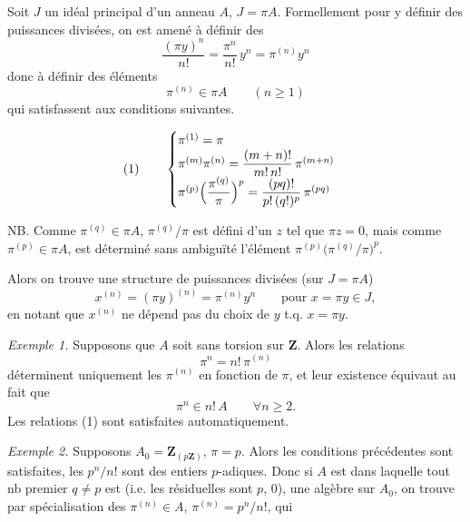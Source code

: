 \documentclass[11pt,a4paper]{article}
\begin{document}


Soit $J$ un idéal principal d'un anneau $A$, $J = \pi A$. Formellement pour
y définir des puissances divisées, on est amené à définir des
\[
\frac{(\pi y)^n}{n!} = \frac{\pi^n}{n!}\, y^n = \pi^{(n)} y^n
\]
donc à définir des éléments
\[
\pi^{(n)} \in \pi A \qquad (n \geq 1)
\]
qui satisfassent aux conditions suivantes.

 

\[
(1)\qquad
\begin{cases}
\pi^{(1)} = \pi \\ \pi^{(m)} \pi^{(n)} = \dfrac{(m+n)!}{m!\,n!}\, \pi^{(m+n)} \\ \pi^{(p)} \Bigl(\dfrac{\pi^{(q)}}{\pi}\Bigr)^{p} = \dfrac{(pq)!}{p!\,(q!)^p}\, \pi^{(pq)}
\end{cases}
\]

NB. Comme $\pi^{(q)} \in \pi A$, $\pi^{(q)}/\pi$ est défini  d'un $z$ tel que $\pi z = 0$, mais comme $\pi^{(p)} \in \pi A$, est
déterminé sans ambiguïté l'élément $\pi^{(p)} \bigl(\pi^{(q)}/\pi\bigr)^p$.

Alors on trouve une structure de puissances divisées (sur $J = \pi A$)
\[
x^{(n)} = (\pi y)^{(n)} = \pi^{(n)} y^n \qquad \text{pour } x = \pi y \in J,
\]
en notant que $x^{(n)}$ ne dépend pas du choix de $y$ t.q. $x = \pi y$.

\emph{Exemple 1.} Supposons que $A$ soit sans torsion sur $\mathbf{Z}$. Alors
les \struck{\ill{}} relations
\[
\pi^n = n!\, \pi^{(n)}
\]
déterminent uniquement les $\pi^{(n)}$ en fonction de $\pi$, et leur existence
équivaut au fait que
\[
\pi^n \in n!\, A \qquad \forall n \geq 2 .
\]
Les relations (1) sont satisfaites automatiquement.

\emph{Exemple 2.} Supposons $A_0 = \mathbf{Z}_{(p\mathbf{Z})}$, 
$\pi = p$. Alors  les conditions précédentes
sont satisfaites, les $p^n/n!$ sont des entiers $p$-adiques. Donc si $A$ est
\ill{} dans laquelle tout nb premier $q \neq p$ est 
(i.e. les  résiduelles sont $p$, $0$), \ill{} une
algèbre sur $A_0$, on trouve par spécialisation des $\pi^{(n)} \in A$,
$\pi^{(n)} = p^n/n!$, qui
\end{document}
